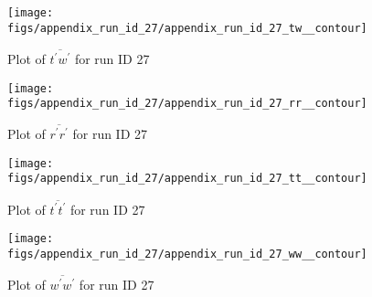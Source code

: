 \begin{figure}[H]
\centering
\texttt{[image: figs/appendix\_run\_id\_27/appendix\_run\_id\_27\_tw\_\_contour]}
\caption{Plot of $\overline{t^\prime w^\prime}$ for run ID 27}
\label{fig:appendix_run_id_27_tw__contour}
\end{figure}


\begin{figure}[H]
\centering
\texttt{[image: figs/appendix\_run\_id\_27/appendix\_run\_id\_27\_rr\_\_contour]}
\caption{Plot of $\overline{r^\prime r^\prime}$ for run ID 27}
\label{fig:appendix_run_id_27_rr__contour}
\end{figure}


\begin{figure}[H]
\centering
\texttt{[image: figs/appendix\_run\_id\_27/appendix\_run\_id\_27\_tt\_\_contour]}
\caption{Plot of $\overline{t^\prime t^\prime}$ for run ID 27}
\label{fig:appendix_run_id_27_tt__contour}
\end{figure}


\begin{figure}[H]
\centering
\texttt{[image: figs/appendix\_run\_id\_27/appendix\_run\_id\_27\_ww\_\_contour]}
\caption{Plot of $\overline{w^\prime w^\prime}$ for run ID 27}
\label{fig:appendix_run_id_27_ww__contour}
\end{figure}


